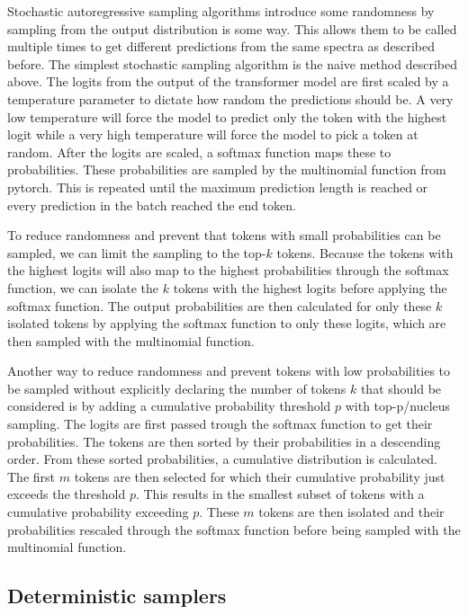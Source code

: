 Stochastic autoregressive sampling algorithms introduce some randomness by sampling from the output distribution is some way.
This allows them to be called multiple times to get different predictions from the same spectra as described before.
The simplest stochastic sampling algorithm is the naive method described above.
The logits from the output of the transformer model are first scaled by a temperature parameter to dictate how random the predictions should be.
A very low temperature will force the model to predict only the token with the highest logit while a very high temperature will force the model to pick a token at random.
After the logits are scaled, a softmax function maps these to probabilities. These probabilities are sampled by the multinomial function from pytorch.
This is repeated until the maximum prediction length is reached or every prediction in the batch reached the end token.

To reduce randomness and prevent that tokens with small probabilities can be sampled, we can limit the sampling to the top-$k$ tokens.
Because the tokens with the highest logits will also map to the highest probabilities through the softmax function,
we can isolate the $k$ tokens with the highest logits before applying the softmax function.
The output probabilities are then calculated for only these $k$ isolated tokens by applying the softmax function to only these logits, which are then sampled with the multinomial function.

Another way to reduce randomness and prevent tokens with low probabilities to be sampled without explicitly declaring the number of tokens $k$ that should be considered is by adding a cumulative probability threshold $p$ with top-p/nucleus sampling.
The logits are first passed trough the softmax function to get their probabilities.
The tokens are then sorted by their probabilities in a descending order.
From these sorted probabilities, a cumulative distribution is calculated.
The first $m$ tokens are then selected for which their cumulative probability just exceeds the threshold $p$.
This results in the smallest subset of tokens with a cumulative probability exceeding $p$.
These $m$ tokens are then isolated and their probabilities rescaled through the softmax function before being sampled with the multinomial function.

\subsection{Deterministic samplers}

